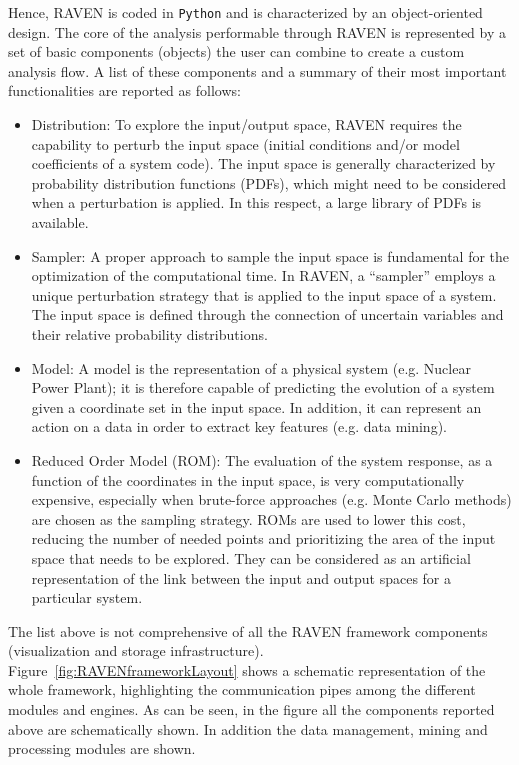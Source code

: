 Hence, RAVEN is coded in \texttt{Python} and is characterized by an object-oriented design. The core of the analysis performable through RAVEN is represented by a set of basic components (objects) the user can combine to create a custom analysis flow. A list of these components and a summary of their most important functionalities are reported as follows:
\begin{itemize}
\item	Distribution: To explore the input/output space, RAVEN requires the capability to perturb the input space (initial conditions and/or model coefficients of a system code). The input space is generally characterized by probability distribution functions (PDFs), which might need to be considered when a perturbation is applied. In this respect, a large library of PDFs is available.
\item Sampler: A proper approach to sample the input space is fundamental for the optimization of the computational time. In RAVEN, a ``sampler'' employs a unique perturbation strategy that is applied to the input space of a system. The input space is defined through the connection of uncertain variables and their relative probability distributions. 
\item Model: A model is the representation of a physical system (e.g. Nuclear Power Plant); it is therefore capable of predicting the evolution of a system given a coordinate set in the input space. In addition, it can represent an
action on a data in order to extract key features (e.g. data mining).
\item Reduced Order Model (ROM): The evaluation of the system response, as a function of the coordinates in the input space, is very computationally expensive, especially when brute-force approaches (e.g. Monte Carlo methods) are chosen as the sampling strategy. ROMs are used to lower this cost, reducing the number of needed points and prioritizing the area of the input space that needs to be explored. They can be considered as an artificial representation of the link between the input and output spaces for a particular system. 
\end{itemize}
The list above is not comprehensive of all the RAVEN framework components (visualization and storage infrastructure).
\\ Figure~\ref{fig:RAVENframeworkLayout} shows a schematic representation of the whole framework, highlighting the communication pipes among the different modules and engines. As can be seen, in the figure all the components reported above are schematically shown. In addition the data management, mining and processing modules are shown.

